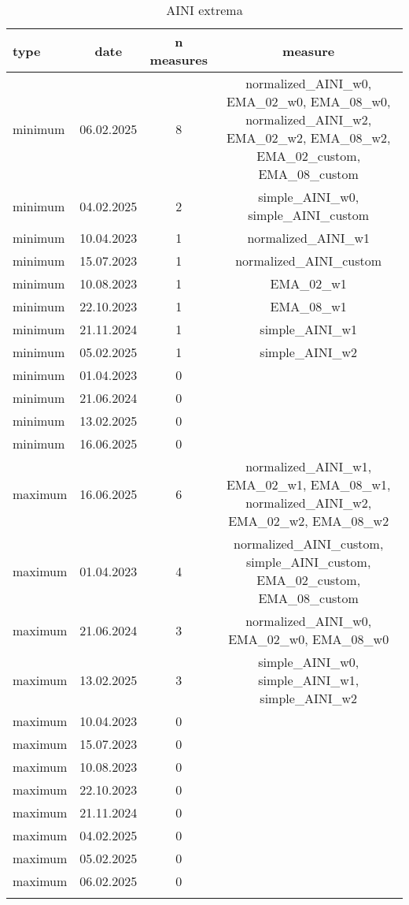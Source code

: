 \begin{table}[!htbp]
\centering
\begin{adjustbox}{width=\textwidth}
\begin{tabular}{lccc}
\toprule
\addlinespace
type & date & n measures & measure \\
\midrule
\addlinespace
minimum & 06.02.2025 & 8 & normalized\_AINI\_w0, EMA\_02\_w0, EMA\_08\_w0, normalized\_AINI\_w2, EMA\_02\_w2, EMA\_08\_w2, EMA\_02\_custom, EMA\_08\_custom \\
minimum & 04.02.2025 & 2 & simple\_AINI\_w0, simple\_AINI\_custom \\
minimum & 10.04.2023 & 1 & normalized\_AINI\_w1 \\
minimum & 15.07.2023 & 1 & normalized\_AINI\_custom \\
minimum & 10.08.2023 & 1 & EMA\_02\_w1 \\
minimum & 22.10.2023 & 1 & EMA\_08\_w1 \\
minimum & 21.11.2024 & 1 & simple\_AINI\_w1 \\
minimum & 05.02.2025 & 1 & simple\_AINI\_w2 \\
minimum & 01.04.2023 & 0 &  \\
minimum & 21.06.2024 & 0 &  \\
minimum & 13.02.2025 & 0 &  \\
minimum & 16.06.2025 & 0 &  \\
maximum & 16.06.2025 & 6 & normalized\_AINI\_w1, EMA\_02\_w1, EMA\_08\_w1, normalized\_AINI\_w2, EMA\_02\_w2, EMA\_08\_w2 \\
maximum & 01.04.2023 & 4 & normalized\_AINI\_custom, simple\_AINI\_custom, EMA\_02\_custom, EMA\_08\_custom \\
maximum & 21.06.2024 & 3 & normalized\_AINI\_w0, EMA\_02\_w0, EMA\_08\_w0 \\
maximum & 13.02.2025 & 3 & simple\_AINI\_w0, simple\_AINI\_w1, simple\_AINI\_w2 \\
maximum & 10.04.2023 & 0 &  \\
maximum & 15.07.2023 & 0 &  \\
maximum & 10.08.2023 & 0 &  \\
maximum & 22.10.2023 & 0 &  \\
maximum & 21.11.2024 & 0 &  \\
maximum & 04.02.2025 & 0 &  \\
maximum & 05.02.2025 & 0 &  \\
maximum & 06.02.2025 & 0 &  \\
\addlinespace
\bottomrule
\end{tabular}
\end{adjustbox}
\caption{AINI extrema}
\label{tab:aini_extrema}
\end{table}
